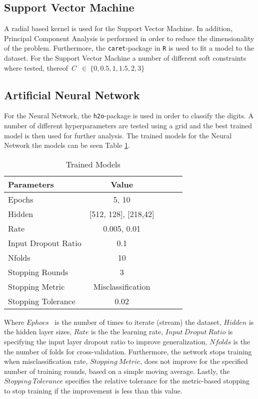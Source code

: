 \documentclass[a4paper,10pt]{article}
\begin{document}
\subsection{Support Vector Machine}
A radial based kernel is used for the Support Vector Machine. In addition,
Principal Component Analysis is performed in order to reduce the
dimensionality of the problem. Furthermore, the \texttt{caret}-package in
\texttt{R} is used to fit a model to the dataset. For the Support Vector Machine
a number of different soft constraints where tested,
thereof~$C$~$\in\ \{0, 0.5, 1, 1.5, 2, 3\}$ \\

\subsection{Artificial Neural Network}
For the Neural Network, the \texttt{h2o}-package is used in order to
classify the digits. A number of different hyperparameters are tested
using a grid and the best trained model is then used for further
analysis. The trained models for the  Neural Network the models can
be seen Table {\ref{table:trained_models_nn}}.

\begin{table}[H]
\centering
\begin{tabular}{l*{3}{c}r}
  Parameters & Value \\
  \hline
  Epochs & 5, 10\\
  Hidden & [512, 128], [218,42]\\
  Rate & 0.005, 0.01\\
  Input Dropout Ratio & 0.1\\
  Nfolds & 10\\
  Stopping Rounds & 3\\
  Stopping Metric & Misclassification\\
  Stopping Tolerance & 0.02\\
\end{tabular}
\caption{Trained Models}
\label{table:trained_models_nn}
\end{table}

Where $Ephocs$  is the number of times to iterate (stream) the dataset,
$Hidden$ is the hidden layer sizes, $Rate$ is the
the learning rate, $Input\ Droput\ Ratio$ is
specifying the input layer dropout ratio to improve generalization,
$Nfolds$ is the the number of folds for cross-validation. Furthermore,
the network stops training when misclassification rate,
$Stopping\ Metric$, does not improve for the specified number of
training rounds, based on a simple moving average. Lastly,
the $Stopping\ Tolerance$
specifies the relative tolerance for the metric-based
stopping to stop training if the improvement is less than this value. \\
\end{document}
